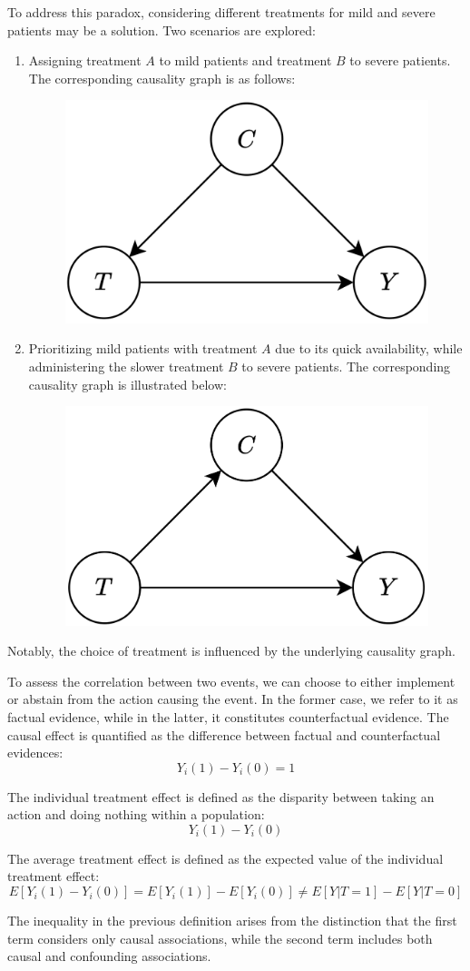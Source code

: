 \begin{example}
    To address this paradox, considering different treatments for mild and severe patients may be a solution. 
    Two scenarios are explored:
    \begin{enumerate}
        \item Assigning treatment $A$ to mild patients and treatment $B$ to severe patients. 
            The corresponding causality graph is as follows:
            \begin{figure}[H]
                \centering
                \includegraphics[width=0.25\linewidth]{images/cau.png}
            \end{figure}
        \item Prioritizing mild patients with treatment $A$ due to its quick availability, while administering the slower treatment $B$ to severe patients.
        The corresponding causality graph is illustrated below:
            \begin{figure}[H]
                \centering
                \includegraphics[width=0.25\linewidth]{images/cau1.png}
            \end{figure}
    \end{enumerate}
    Notably, the choice of treatment is influenced by the underlying causality graph.
\end{example}

To assess the correlation between two events, we can choose to either implement or abstain from the action causing the event.
In the former case, we refer to it as factual evidence, while in the latter, it constitutes counterfactual evidence.
The causal effect is quantified as the difference between factual and counterfactual evidences:
\[Y_i(1)-Y_i(0)=1\]
\begin{definition}
    The individual treatment effect is defined as the disparity between taking an action and doing nothing within a population:
    \[Y_i(1)-Y_i(0)\]
\end{definition}
\begin{definition}
    The average treatment effect is defined as the expected value of the individual treatment effect:
    \[E\left[Y_i(1)-Y_i(0)\right]=E\left[Y_i(1)\right]-E\left[Y_i(0)\right] \neq E\left[ Y|T=1 \right]-E\left[ Y|T=0 \right]\]
\end{definition}
The inequality in the previous definition arises from the distinction that the first term considers only causal associations, while the second term includes both causal and confounding associations.

